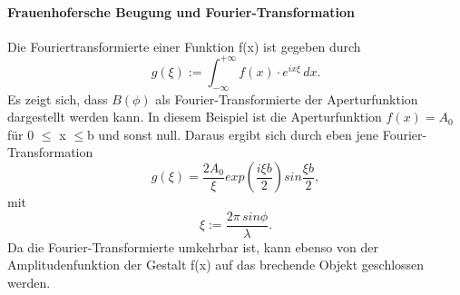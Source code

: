 \paragraph{Frauenhofersche Beugung und Fourier-Transformation}
Die Fouriertransformierte einer Funktion f(x) ist gegeben durch
\begin{equation}
    \label{eq:8}
    g(\xi) :=  \int_{- \infty}^{+ \infty} f(x) \cdot e^{ix \xi} \,dx.
\end{equation}
Es zeigt sich, dass $B(\phi)$ als Fourier-Transformierte der Aperturfunktion dargestellt werden kann.
In diesem Beispiel ist die Aperturfunktion $f(x) = A_0$ für 0 $\leq$ x $\leq $b und sonst null.
Daraus ergibt sich durch eben jene Fourier-Transformation
\begin{equation}
    \label{eq:9}
    g(\xi) = \frac{2 A_0}{\xi} exp \left(\frac{i \xi b}{2}\right) sin \frac{\xi b}{2},
\end{equation}
mit
\begin{equation}
    \label{eq:10}
    \xi := \frac{2 \pi \, sin \phi}{\lambda}.
\end{equation}
Da die Fourier-Transformierte umkehrbar ist, kann ebenso von der Amplitudenfunktion der Gestalt f(x) auf das brechende 
Objekt geschlossen werden.

